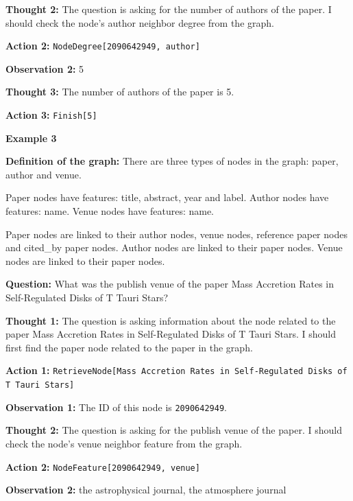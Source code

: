 \textbf{Thought 2:} The question is asking for the number of authors of the paper. I should check the node's author neighbor degree from the graph. \par
\textbf{Action 2:} \texttt{NodeDegree[2090642949, author]} \par
\textbf{Observation 2:} 5 \par

\textbf{Thought 3:} The number of authors of the paper is 5. \par
\textbf{Action 3:} \texttt{Finish[5]} \par

\bigskip

\textbf{Example 3} \par
\medskip

\textbf{Definition of the graph:}
There are three types of nodes in the graph: paper, author and venue. \par
Paper nodes have features: title, abstract, year and label. Author nodes have features: name. Venue nodes have features: name. \par
Paper nodes are linked to their author nodes, venue nodes, reference paper nodes and cited\_by paper nodes. Author nodes are linked to their paper nodes. Venue nodes are linked to their paper nodes. \par

\textbf{Question:}
What was the publish venue of the paper Mass Accretion Rates in Self-Regulated Disks of T Tauri Stars? \par

\textbf{Thought 1:} The question is asking information about the node related to the paper Mass Accretion Rates in Self-Regulated Disks of T Tauri Stars. I should first find the paper node related to the paper in the graph. \par
\textbf{Action 1:} \texttt{RetrieveNode[Mass Accretion Rates in Self-Regulated Disks of T Tauri Stars]} \par
\textbf{Observation 1:} The ID of this node is \texttt{2090642949}. \par

\textbf{Thought 2:} The question is asking for the publish venue of the paper. I should check the node's venue neighbor feature from the graph. \par
\textbf{Action 2:} \texttt{NodeFeature[2090642949, venue]} \par
\textbf{Observation 2:} the astrophysical journal, the atmosphere journal \par

